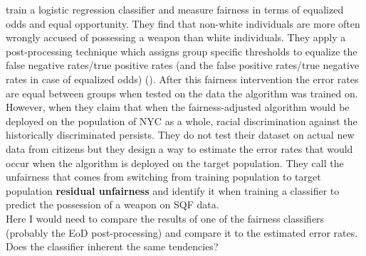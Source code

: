 \cite{kallus2018} train a logistic regression classifier and measure fairness in terms of equalized odds and equal opportunity. They find that non-white individuals are more often wrongly accused of possessing a weapon than white individuals. They apply a post-processing technique which assigns group specific thresholds to equalize the false negative rates/true positive rates (and the false positive rates/true negative rates in case of equalized odds) (\cite{hardt2016}).
After this fairness intervention the error rates are equal between groups when tested on the data the algorithm was trained on. However, when they claim that when the fairness-adjusted algorithm would be deployed on the population of NYC as a whole, racial discrimination against the historically discriminated persists. They do not test their dataset on actual new data from citizens but they design a way to estimate the error rates that would occur when the algorithm is deployed on the target population. They call the unfairness that comes from switching from training population to target population \textbf{residual unfairness} and identify it when training a classifier to predict the possession of a weapon on SQF data.\\
Here I would need to compare the results of one of the fairness classifiers (probably the EoD post-processing) and compare it to the estimated error rates. Does the classifier inherent the same tendencies?


